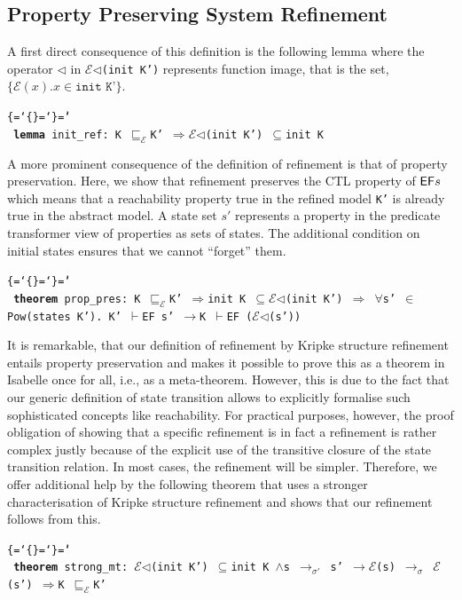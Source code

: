 \documentclass{llncs}
\newenvironment{ttbox}{\begin{alltt}\ttbraces\small\tt}%
                      {\end{alltt}}
\def\ttbraces{\let\.=\nobreak\chardef\{=`\{\chardef\}=`\}\chardef\|=`\\}
\newcommand\ttand{\mbox{{$\land$}}}
\newcommand\ttimp{\mbox{{$\longrightarrow$}}}
\newcommand\ttforall{\mbox{{$\forall$}}}
\newcommand\ttin{\mbox{{$\in$}}}
\newcommand\ttImp{\mbox{{$\Longrightarrow$}}}
\newcommand\ttrel[1]{\mbox{{$\to_{#1}$}}}
\newcommand\ttsubseteq{\mbox{{$\subseteq$}}}
\newcommand\ttvdash{\mbox{{$\vdash$}}}
\newcommand\ttmref[1]{\mbox{{$\sqsubseteq_{#1}$}}}
\newcommand\ttmeref{\ttmref{\mathcal{E}}}
\newcommand\ttecal{\mbox{$\mathcal{E}$}}
\newcommand\ttimg{\mbox{$\triangleleft$}}
\begin{document}
\subsection{Property Preserving System Refinement}
A first direct consequence of this definition is the following lemma
where the operator \texttt{$\ttimg$} in \texttt{\ttecal\ttimg(init K')}
represents function image, that is the set, $\{\ttecal(x). x \in \texttt{init K'}\} $.
\begin{ttbox}
{\bf{lemma}} init_ref: K \ttmeref K' \ttImp \ttecal\ttimg(init K') \ttsubseteq init K
\end{ttbox}
A more prominent consequence of the definition of refinement 
is that of property preservation. Here, we show that refinement preserves the
CTL property of ${\sf EF} s$ which means that a reachability property true in the
refined  model \texttt{K'} %
is already true in the abstract model.
A state set $s'$ represents a property %
in the predicate transformer view of properties as sets of states. 
The additional condition on initial states ensures that we cannot ``forget'' them. 
\begin{ttbox}
{\bf{theorem}} prop_pres: 
   K \ttmeref K'  \ttImp init K \ttsubseteq \ttecal\ttimg(init K') \ttImp
   \ttforall s' \ttin Pow(states K'). K' \ttvdash {\sf EF} s' 
              \ttimp K \ttvdash {\sf EF} (\ttecal\ttimg(s'))
\end{ttbox}
It is remarkable, that our definition of refinement by Kripke 
structure refinement entails property preservation and makes it possible 
to prove this as a theorem in Isabelle once for all, i.e., as a meta-theorem.
However, this is due to the fact that our generic definition of state transition
allows to explicitly formalise such sophisticated concepts like reachability.
For practical purposes, however, the proof obligation of showing that
a specific refinement is in fact a refinement is rather complex
justly because of the explicit use of the transitive closure of the state
transition relation.
In most cases, the refinement will be simpler. Therefore, we offer
additional help by the following theorem that uses a stronger characterisation
of Kripke structure refinement and shows that our refinement follows
from this.
\begin{ttbox}
{\bf{theorem}} strong_mt: 
\ttecal\ttimg(init K') \ttsubseteq init K \ttand s \ttrel{\sigma'} s' \ttimp \ttecal(s) \ttrel{\sigma} \ttecal(s') 
\ttImp K \ttmeref K'
\end{ttbox}
\end{document}
